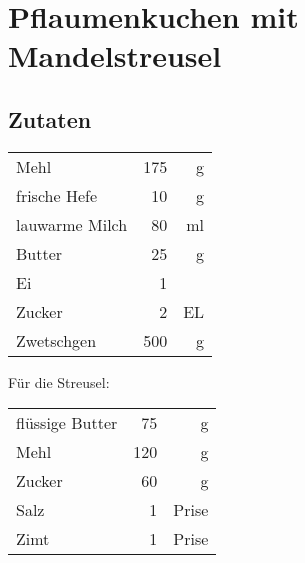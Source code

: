 \section{Pflaumenkuchen mit Mandelstreusel} 
\subsection*{Zutaten}

\begin{tabular}{lrr}
	Mehl           & 175 &  g \\
	frische Hefe   &  10 &  g \\
	lauwarme Milch &  80 & ml \\
	Butter         &  25 &  g \\
	Ei             &   1 &    \\
	Zucker         &   2 & EL \\
	Zwetschgen     & 500 &  g
\end{tabular} 

Für die Streusel:\\
\begin{tabular}{lrr}
	flüssige Butter &  75 &     g \\
	Mehl            & 120 &     g \\
	Zucker          &  60 &     g \\
	Salz            &   1 & Prise \\
	Zimt            &   1 & Prise
\end{tabular} 

